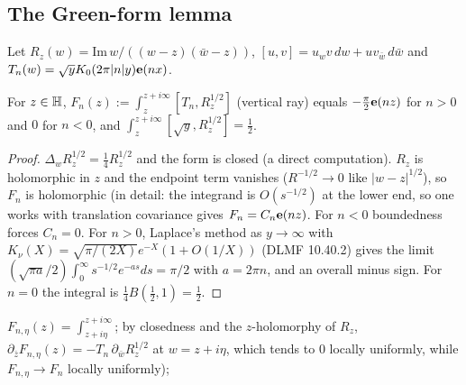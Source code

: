 \subsection{The Green-form lemma}
Let $R_z(w)=\mathrm{Im}\,w/((w-z)(\bar w-z))$, $[u,v]=u_wv\,dw+uv_{\bar w}\,d\bar w$ and $T_n(w)=\sqrt yK_0(2\pi|n|y)\mathbf{e}(nx)$.
\begin{lemma}\label{lem:green}
For $z\in\mathbb{H}$, $F_n(z):=\int_z^{z+i\infty}[T_n,R_z^{1/2}]$ (vertical ray) equals $-\tfrac\pi2\mathbf{e}(nz)$ for $n>0$ and $0$ for $n<0$, and
$\int_z^{z+i\infty}[\sqrt y,R_z^{1/2}]=\tfrac12$.
\end{lemma}
\begin{proof}
$\Delta_wR_z^{1/2}=\tfrac14R_z^{1/2}$ and the form is closed (a direct computation). $R_z$ is holomorphic in $z$ and the endpoint term vanishes
($R^{-1/2}\to0$ like $|w-z|^{1/2}$), so $F_n$ is holomorphic (in detail: the integrand is $O(s^{-1/2})$ at the lower end, so one works with translation covariance gives $F_n=C_n\mathbf{e}(nz)$. For $n<0$ boundedness forces $C_n=0$.
For $n>0$, Laplace's method as $y\to\infty$ with $K_\nu(X)=\sqrt{\pi/(2X)}e^{-X}(1+O(1/X))$ (DLMF 10.40.2) gives the limit
$(\sqrt{\pi a}/2)\int_0^\infty s^{-1/2}e^{-as}ds=\pi/2$ with $a=2\pi n$, and an overall minus sign. For $n=0$ the integral is
$\tfrac14B(\tfrac12,1)=\tfrac12$.
\end{proof}
$F_{n,\eta}(z)=\int_{z+i\eta}^{z+i\infty}$; by closedness and the $z$-holomorphy of $R_z$, $\partial_{\bar z}F_{n,\eta}(z)=-T_n\,\partial_{\bar w}R_z^{1/2}$ at
$w=z+i\eta$, which tends to $0$ locally uniformly, while $F_{n,\eta}\to F_n$ locally uniformly);

